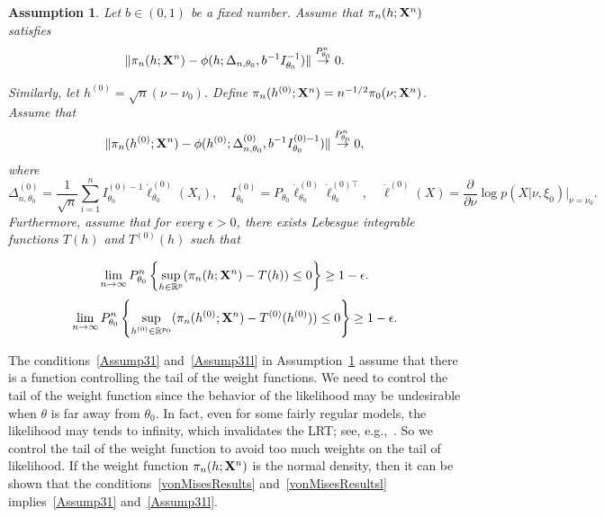 \documentclass[11pt]{article}
\theoremstyle{plain}
\newtheorem{assumption}{\quad\quad Assumption}
\theoremstyle{definition}
\theoremstyle{remark}
\begin{document}
\begin{assumption}\label{Assumption3}
    Let $b\in(0,1)$ be a fixed number.
    Assume that $\pi_n(h;\mathbf{X}^{n})$ satisfies
        \begin{equation}\label{vonMisesResults}
            \|\pi_n(h;\mathbf{X}^{n})-\phi(h;\Delta_{n,\theta_0},b^{-1}I_{\theta_0}^{-1})\|\overset{P_{\theta_0}^n}{\to}0.
        \end{equation}

        Similarly, let $h^{(0)}=\sqrt{n}(\nu-\nu_0)$. Define $\pi_n(h^{(0)};\mathbf{X}^{n})=n^{-1/2}\pi_0(\nu;\mathbf{X}^{n})$. Assume that 
\begin{equation}\label{vonMisesResultsl}
    \|\pi_n(h^{(0)};\mathbf{X}^{n})-\phi(h^{(0)};\Delta^{(0)}_{n,\theta_0},b^{-1}I_{\theta_0}^{(0)-1})\|\overset{P_{\theta_0}^n}{\to}0,
\end{equation}
where 
$$ \Delta_{n,\theta_0}^{(0)}
=\frac{1}{\sqrt{n}}\sum_{i=1}^n I_{\theta_0}^{(0)-1}\dot{\ell}^{(0)}_{\theta_0}(X_i),
\quad I^{(0)}_{\theta_0}=P_{\theta_0}\dot{\ell}_{\theta_0}^{(0)}\dot{\ell}_{\theta_0}^{(0)\top},\quad 
\dot{\ell}^{(0)}(X)=\frac{\partial}{\partial \nu}\log p(X|\nu,\xi_0)\Big|_{\nu=\nu_0}
.
$$
Furthermore, assume that for every $\epsilon>0$, there exists Lebesgue integrable functions $T(h)$ and $T^{(0)}(h)$ such that 

    \begin{equation}\label{Assump31}
        \lim_{n\to \infty}P_{\theta_0}^n\left\{\sup_{h\in \mathbb{R}^p}(\pi_n(h;\mathbf{X}^{n})-T(h))\leq 0\right\}\geq 1-\epsilon.
\end{equation}
    \begin{equation}\label{Assump31l}
        \lim_{n\to \infty}P_{\theta_0}^n\left\{\sup_{h^{(0)}\in \mathbb{R}^{p_0}}(\pi_n(h^{(0)};\mathbf{X}^{n})-T^{(0)}(h^{(0)}))\leq 0\right\}\geq 1-\epsilon.
\end{equation}


\end{assumption}
The conditions~\eqref{Assump31} and~\eqref{Assump31l} in Assumption~\ref{Assumption3} assume that there is a function controlling the tail of the weight functions.
We need to control the tail of the weight function since the behavior of the likelihood may be undesirable when $\theta$ is far away from $\theta_0$.
In fact, even for some fairly regular models, the likelihood may tends to infinity, which invalidates the LRT; see, e.g.,~\cite{Cam1990Maximum}.
So we control the tail of the weight function to avoid too much weights on the tail of likelihood.
If the weight function $\pi_n(h;\mathbf{X}^{n})$ is the normal density, then it can be shown that the conditions~\eqref{vonMisesResults} and~\eqref{vonMisesResultsl} implies~\eqref{Assump31} and~\eqref{Assump31l}.
\end{document}
